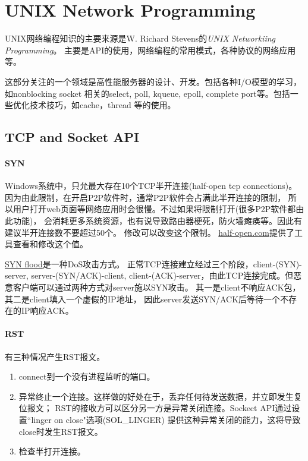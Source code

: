 \part{UNIX Network Programming}

UNIX网络编程知识的主要来源是W. Richard Stevens的\emph{UNIX Networkiing Programming}。
主要是API的使用，网络编程的常用模式，各种协议的网络应用等。

这部分关注的一个领域是高性能服务器的设计、开发。包括各种I/O模型的学习，如nonblocking socket
相关的select, poll, kqueue, epoll, complete port等。包括一些优化技术技巧，如cache，thread
等的使用。

\chapter{TCP and Socket API}
\subsection{SYN}
Windows系统中，只允最大存在10个TCP半开连接(half-open tcp connections)。
因为由此限制，在开启P2P软件时，通常P2P软件会占满此半开连接的限制，
所以用户打开web页面等网络应用时会很慢。不过如果将限制打开(很多P2P软件都由此功能)，
会消耗更多系统资源，也有说导致路由器梗死，防火墙瘫痪等。因此有建议半开连接数不要超过50个。
修改可以改变这个限制。
\href{http://half-open.com/}{half-open.com}提供了工具查看和修改这个值。

\href{http://en.wikipedia.org/wiki/SYN_flood}{SYN flood}是一种DoS攻击方式。
正常TCP连接建立经过三个阶段，client-(SYN)-server, server-(SYN/ACK)-client,
client-(ACK)-server，由此TCP连接完成。但恶意客户端可以通过两种方式对server施以SYN攻击。
其一是client不响应ACK包，其二是client填入一个虚假的IP地址，
因此server发送SYN/ACK后等待一个不存在的IP响应ACK。

\subsection{RST}
有三种情况产生RST报文。
\begin{enumerate}
\item connect到一个没有进程监听的端口。
\item 异常终止一个连接。这样做的好处在于，丢弃任何待发送数据，并立即发生复位报文；
RST的接收方可以区分另一方是异常关闭连接。Sockect API通过设置``linger on close"选项(SOL\_LINGER)
提供这种异常关闭的能力，这将导致close时发生RST报文。
\item 检查半打开连接。
\end{enumerate}

